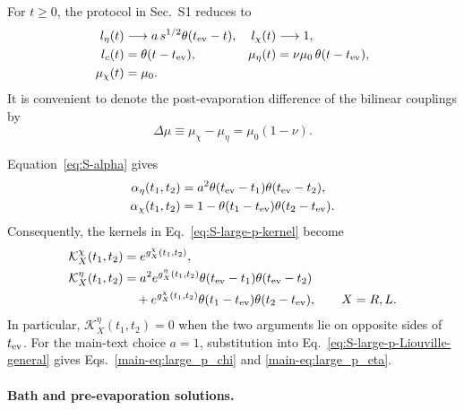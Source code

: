 \documentclass[11pt,a4paper]{article}
\begin{document}
For \(t\geq0\), the protocol in Sec.~S1 reduces to
\begin{equation}
\begin{aligned}
l_\eta(t)
&\longrightarrow
a\,s^{1/2}\theta(t_{\rm ev}-t),
&
l_\chi(t)
&\longrightarrow1,
\\
l_c(t)
&=
\theta(t-t_{\rm ev}),
&
\mu_\eta(t)
&=
\nu\mu_0\,\theta(t-t_{\rm ev}),
\\
\mu_\chi(t)
&=
\mu_0 .
\end{aligned}
\label{eq:S3-probe-protocol}
\end{equation}
It is convenient to denote the post-evaporation difference of the bilinear
couplings by
\begin{equation}
\Delta\mu
\equiv
\mu_\chi-\mu_\eta
=
\mu_0(1-\nu).
\label{eq:S3-delta-mu}
\end{equation}

Equation~\eqref{eq:S-alpha} gives
\begin{equation}
\begin{aligned}
\alpha_\eta(t_1,t_2)
&=
a^2
\theta(t_{\rm ev}-t_1)
\theta(t_{\rm ev}-t_2),
\\
\alpha_\chi(t_1,t_2)
&=
1-
\theta(t_1-t_{\rm ev})
\theta(t_2-t_{\rm ev}).
\end{aligned}
\label{eq:S3-probe-alpha}
\end{equation}
Consequently, the kernels in Eq.~\eqref{eq:S-large-p-kernel} become
\begin{equation}
\begin{aligned}
\mathcal K^\chi_X(t_1,t_2)
&=
e^{g^\chi_X(t_1,t_2)},
\\
\mathcal K^\eta_X(t_1,t_2)
&=
a^2e^{g^\eta_X(t_1,t_2)}
\theta(t_{\rm ev}-t_1)
\theta(t_{\rm ev}-t_2)
\\
&\quad+
e^{g^\chi_X(t_1,t_2)}
\theta(t_1-t_{\rm ev})
\theta(t_2-t_{\rm ev}),
\qquad
X=R,L .
\end{aligned}
\label{eq:S3-probe-kernels}
\end{equation}
In particular,
\(\mathcal K^\eta_X(t_1,t_2)=0\) when the two arguments lie on opposite
sides of \(t_{\rm ev}\). For the main-text choice \(a=1\), substitution into
Eq.~\eqref{eq:S-large-p-Liouville-general} gives
Eqs.~\eqref{main-eq:large_p_chi} and \eqref{main-eq:large_p_eta}.

\paragraph*{Bath and pre-evaporation solutions.}
\end{document}
